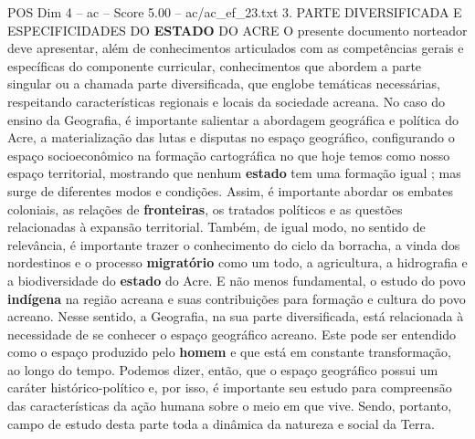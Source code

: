 \begin{textsample}{POS Dim 4 – ac – Score 5.00 – ac/ac\_ef\_23.txt}  \label{ex:f4_pos_246}
3.
PARTE DIVERSIFICADA E ESPECIFICIDADES DO \textbf{ESTADO} DO ACRE O presente documento norteador deve apresentar, além de conhecimentos articulados com as competências gerais e específicas do componente curricular, conhecimentos que abordem a parte singular ou a chamada parte diversificada, que englobe temáticas necessárias, respeitando características regionais e locais da sociedade acreana.
No caso do ensino da Geografia, é importante salientar a abordagem geográfica e política do Acre, a materialização das lutas e disputas no espaço geográfico, configurando o espaço socioeconômico na formação cartográfica no que hoje temos como nosso espaço territorial, mostrando que nenhum \textbf{estado} tem uma formação igual ; mas surge de diferentes modos e condições.
Assim, é importante abordar os embates coloniais, as relações de \textbf{fronteiras}, os tratados políticos e as questões relacionadas à expansão territorial.
Também, de igual modo, no sentido de relevância, é importante trazer o conhecimento do ciclo da borracha, a vinda dos nordestinos e o processo \textbf{migratório} como um todo, a agricultura, a hidrografia e a biodiversidade do \textbf{estado} do Acre.
E não menos fundamental, o estudo do povo \textbf{indígena} na região acreana e suas contribuições para formação e cultura do povo acreano.
Nesse sentido, a Geografia, na sua parte diversificada, está relacionada à necessidade de se conhecer o espaço geográfico acreano.
Este pode ser entendido como o espaço produzido pelo \textbf{homem} e que está em constante transformação, ao longo do tempo.
Podemos dizer, então, que o espaço geográfico possui um caráter histórico-político e, por isso, é importante seu estudo para compreensão das características da ação humana sobre o meio em que vive.
Sendo, portanto, campo de estudo desta parte toda a dinâmica da natureza e social da Terra.

\end{textsample}
